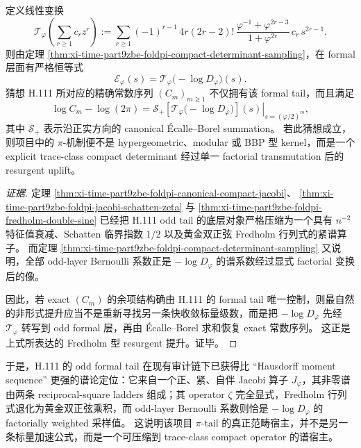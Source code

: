 \begin{conjecture}\label{conj:xi-time-part9zbe-foldpi-ecalle-fredholm-lift}
定义线性变换
\[
\mathcal T_\varphi\!\left(\sum_{r\ge 1}c_r z^r\right)
:=
\sum_{r\ge 1}
(-1)^{r-1}\,
4r(2r-2)!\,
\frac{\varphi^{-1}+\varphi^{2r-3}}{1+\varphi^{2r}}\,
c_r\,s^{2r-1}.
\]
则由定理 \ref{thm:xi-time-part9zbe-foldpi-compact-determinant-sampling}，在 formal 层面有严格恒等式
\[
\mathcal E_\varphi(s)
=
\mathcal T_\varphi\!\bigl(-\log D_\varphi\bigr)(s).
\]
猜想 H.111 所对应的精确常数序列 \((C_m)_{m\ge 1}\) 不仅拥有该 formal tail，而且满足
\[
\log C_m-\log(2\pi)
=
\left.
\mathscr S_+\!\left[\mathcal T_\varphi\!\bigl(-\log D_\varphi\bigr)\right](s)
\right|_{s=(\varphi/2)^m},
\]
其中 \(\mathscr S_+\) 表示沿正实方向的 canonical Écalle--Borel summation。
若此猜想成立，则项目中的 \(\pi\)-机制便不是 hypergeometric、modular 或 BBP 型 kernel，而是一个 explicit trace-class compact determinant 经过单一 factorial transmutation 后的 resurgent uplift。
\end{conjecture}
\begin{proof}[证据]
定理 \ref{thm:xi-time-part9zbe-foldpi-canonical-compact-jacobi}、
\ref{thm:xi-time-part9zbe-foldpi-jacobi-schatten-zeta}
与 \ref{thm:xi-time-part9zbe-foldpi-fredholm-double-sine}
已经把 H.111 odd tail 的底层对象严格压缩为一个具有 \(n^{-2}\) 特征值衰减、Schatten 临界指数 \(1/2\) 以及黄金双正弦 Fredholm 行列式的紧谱算子。
而定理 \ref{thm:xi-time-part9zbe-foldpi-compact-determinant-sampling} 又说明，全部 odd-layer Bernoulli 系数正是 \(-\log D_\varphi\) 的谱系数经过显式 factorial 变换后的像。

因此，若 exact \((C_m)\) 的余项结构确由 H.111 的 formal tail 唯一控制，则最自然的非形式提升应当不是重新寻找另一条快收敛标量级数，而是把 \(-\log D_\varphi\) 先经 \(\mathcal T_\varphi\) 转写到 odd formal 层，再由 Écalle--Borel 求和恢复 exact 常数序列。
这正是上式所表达的 Fredholm 型 resurgent 提升。证毕。
\end{proof}

\noindent
于是，H.111 的 odd formal tail 在现有审计链下已获得比 “Hausdorff moment sequence” 更强的谱论定位：它来自一个正、紧、自伴 Jacobi 算子 \(J_\varphi\)，其非零谱由两条 reciprocal-square ladders 组成；其 operator \(\zeta\) 完全显式，Fredholm 行列式退化为黄金双正弦乘积，而 odd-layer Bernoulli 系数则恰是 \(-\log D_\varphi\) 的 factorially weighted 采样值。
这说明该项目 \(\pi\)-tail 的真正范畴宿主，并不是另一条标量加速公式，而是一个可压缩到 trace-class compact operator 的谱宿主。

\endinput
